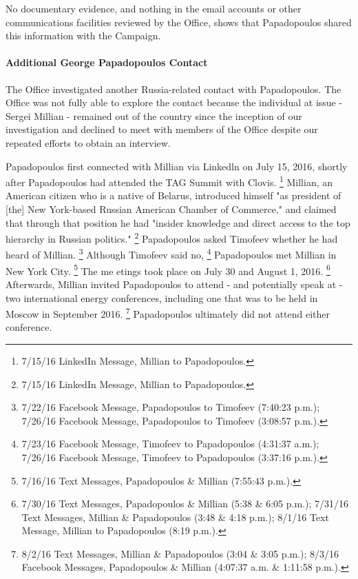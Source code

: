 No documentary evidence, and nothing in the email accounts or other communications facilities reviewed by the Office, shows that Papadopoulos shared this information with the Campaign.

\paragraph{Additional George Papadopoulos Contact}

The Office investigated another Russia-related contact with Papadopoulos.
The Office was not fully able to explore the contact because the individual at issue - Sergei Millian - remained out of the country since the inception of our investigation and declined to meet with members of the Office despite our repeated efforts to obtain an interview.

Papadopoulos first connected with Millian via Linkedln on July 15, 2016, shortly after Papadopoulos had attended the TAG Summit with Clovis.%
\footnote{7/15/16 LinkedIn Message, Millian to Papadopoulos.}
Millian, an American citizen who is a native of Belarus, introduced himself "as president of [the] New York-based Russian American Chamber of Commerce," and claimed that through that position he had "insider knowledge and direct access to the top hierarchy in Russian politics."%
\footnote{7/15/16 LinkedIn Message, Millian to Papadopoulos.}
Papadopoulos asked Timofeev whether he had heard of Millian.%
\footnote{7/22/16 Facebook Message, Papadopoulos to Timofeev (7:40:23 p.m.);
7/26/16 Facebook Message, Papadopoulos to Timofeev (3:08:57 p.m.).}
Although Timofeev said no,%
\footnote{7/23/16 Facebook Message, Timofeev to Papadopoulos (4:31:37 a.m.);
7/26/16 Facebook Message, Timofeev to Papadopoulos (3:37:16 p.m.).}
Papadopoulos met Millian in New York City.%
\footnote{7/16/16 Text Messages, Papadopoulos \& Millian (7:55:43 p.m.).}
The me etings took place on July 30 and August 1, 2016.%
\footnote{7/30/16 Text Messages, Papadopoulos \& Millian (5:38 \& 6:05 p.m.);
7/31/16 Text Messages, Millian \& Papadopoulos (3:48 \& 4:18 p.m.);
8/1/16 Text Message, Millian to Papadopoulos (8:19 p.m.).}
Afterwards, Millian invited Papadopoulos to attend - and potentially speak at - two international energy conferences, including one that was to be held in Moscow in September 2016.%
\footnote{8/2/16 Text Messages, Millian \& Papadopoulos (3:04 \& 3:05 p.m.);
8/3/16 Facebook Messages, Papadopoulos \& Millian (4:07:37 a.m. \& 1:11:58 p.m.).}
Papadopoulos ultimately did not attend either conference.

